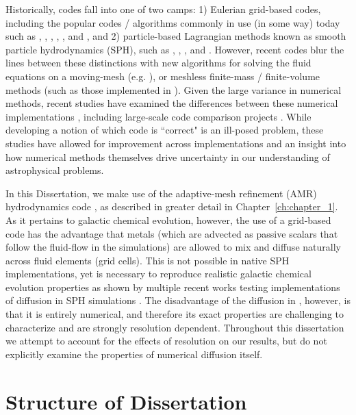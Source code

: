 Historically, codes fall into one of two camps: 1) Eulerian grid-based codes, including the popular codes / algorithms commonly in use (in some way) today such as  \citep{StoneNorman1992},  \citep{FLASH},  \citep{Teyssier2002},  \citep{Athena},  \citep{Rudd2008}, and  \citep{Enzo2014}, and 2) particle-based Lagrangian methods known as smooth particle hydrodynamics (SPH), such as  \citep{Springel2005},  \citep{Stadel2001},  \citep{Wadsley2004}, and  \citep{Menon2015}. However, recent codes blur the lines between these distinctions with new algorithms for solving the fluid equations on a moving-mesh (e.g.  \citep{Springel2010}), or meshless finite-mass / finite-volume methods (such as those implemented in  \citep{Hopkins2015}). Given the large variance in numerical methods, recent studies have examined the differences between these numerical implementations \citep[e.g.][]{Agertz2007}, including large-scale code comparison projects \citep[e.g.][]{AGORA,AGORA2}. While developing a notion of which code is ``correct" is an ill-posed problem, these studies have allowed for improvement across implementations and an insight into how numerical methods themselves drive uncertainty in our understanding of astrophysical problems.

In this Dissertation, we make use of the adaptive-mesh refinement (AMR) hydrodynamics code , as described in greater detail in Chapter~\ref{ch:chapter_1}. As it pertains to galactic chemical evolution, however, the use of a grid-based code has the advantage that metals (which are advected as passive scalars that follow the fluid-flow in the simulations) are allowed to mix and diffuse naturally across fluid elements (grid cells). This is not possible in native SPH implementations, yet is necessary to reproduce realistic galactic chemical evolution properties as shown by multiple recent works testing implementations of diffusion in SPH simulations \citep[e.g.][]{Shen2010,Su2017a,Escala2018}. The disadvantage of the diffusion in , however, is that it is entirely numerical, and therefore its exact properties are challenging to characterize and are strongly resolution dependent. Throughout this dissertation we attempt to account for the effects of resolution on our results, but do not explicitly examine the properties of numerical diffusion itself. 


\section{Structure of Dissertation}\label{sec:structure}

